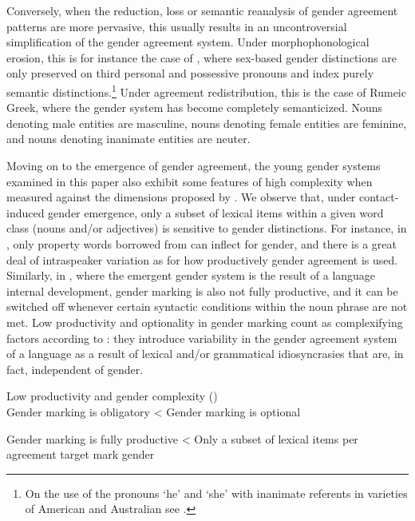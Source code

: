 \documentclass[output=collectionpaper]{langsci/langscibook}
\begin{document}
Conversely, when the reduction, loss or semantic reanalysis of gender agreement patterns are more pervasive, this usually results in an uncontroversial simplification of the gender agreement system. Under morphophonological erosion, this is for instance the case of , where sex-based gender distinctions are only preserved on third personal and possessive pronouns and index purely semantic distinctions.\footnote{On the use of the pronouns `he' and `she' with inanimate referents in varieties of American and Australian  see \citet{Pawley2004}.}  Under agreement redistribution, this is the case of Rumeic Greek, where the gender system has become completely semanticized. Nouns denoting male entities are masculine, nouns denoting female entities are feminine, and nouns denoting inanimate entities are neuter.

Moving on to the emergence of gender agreement, the young gender systems examined in this paper also exhibit some features of high complexity when measured against the dimensions proposed by \citet{Audring2017}.  We observe that, under contact-induced gender emergence, only a subset of lexical items within a given word class (nouns and/or adjectives) is sensitive to
gender distinctions. For instance, in , only property words borrowed from  can inflect for gender, and there is a great deal of intraspeaker variation as for how productively gender agreement is used. Similarly, in , where the emergent gender system is the result of a language internal development, gender marking is also not fully productive, and it can be switched off whenever certain syntactic conditions within the noun phrase are not met.  Low productivity and optionality in gender marking count as complexifying factors according to \citet{Audring2017}: they introduce variability in the gender agreement system of a language as a result of lexical and/or grammatical idiosyncrasies that are, in fact, independent of gender.


\ea\label{ex:dgm:13:Audring4}
Low productivity and gender complexity (\citealt{Audring2017})\\

\vspace{3mm}
Gender marking is obligatory {\textless} Gender marking is optional

\vspace{3mm}
Gender marking is fully productive  {\textless} Only a subset of lexical items per agreement target mark gender
\end{document}
